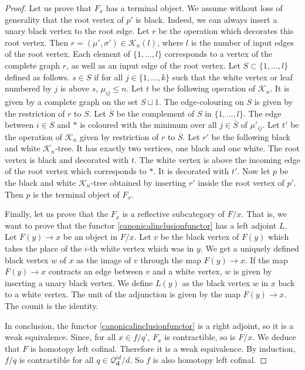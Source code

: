 \documentclass[]{amsart}
\theoremstyle{definition}
\begin{document}
\begin{proof}
	Let us prove that $F_x$ has a terminal object. We assume without loss of generality that the root vertex of $p'$ is black. Indeed, we can always insert a unary black vertex to the root edge. Let $r$ be the operation which decorates this root vertex. Then $r = (\mu',\sigma') \in \mathcal{K}_n(l)$, where $l$ is the number of input edges of the root vertex. Each element of $\{1,\ldots,l\}$ corresponds to a vertex of the complete graph $r$, as well as an input edge of the root vertex. Let $S \subset \{1,\ldots,l\}$ defined as follows. $s \in S$ if for all $j \in \{1,\ldots,k\}$ such that the white vertex or leaf numbered by $j$ is above $s$, $\mu_{ij} \leq n$. Let $t$ be the following operation of $\mathcal{K}_n$. It is given by a complete graph on the set $S \sqcup 1$. The edge-colouring on $S$ is given by the restriction of $r$ to $S$. Let $\overline{S}$ be the complement of $S$ in $\{1,\ldots,l\}$. The edge between $i \in S$ and $*$ is coloured with the minimum over all $j \in \overline{S}$ of $\mu'_{ij}$. Let $t'$ be the operation of $\mathcal{K}_n$ given by restriction of $r$ to $\overline{S}$. Let $r'$ be the following black and white $\mathcal{K}_n$-tree. It has exactly two vertices, one black and one white. The root vertex is black and decorated with $t$. The white vertex is above the incoming edge of the root vertex which corresponds to $*$. It is decorated with $t'$. Now let $p$ be the black and white $\mathcal{K}_n$-tree obtained by inserting $r'$ inside the root vertex of $p'$. Then $p$ is the terminal object of $F_x$.
	
	Finally, let us prove that the $F_x$ is a reflective subcategory of $F/x$. That is, we want to prove that the functor \eqref{canonicalinclusionfunctor} has a left adjoint $L$. Let $F(y) \to x$ be an object in $F/x$. Let $v$ be the black vertex of $F(y)$ which takes the place of the $i$-th white vertex which was in $y$. We get a uniquely defined black vertex $w$ of $x$ as the image of $v$ through the map $F(y) \to x$. If the map $F(y) \to x$ contracts an edge between $v$ and a white vertex, $w$ is given by inserting a unary black vertex. We define $L(y)$ as the black vertex $w$ in $x$ back to a white vertex. The unit of the adjunction is given by the map $F(y) \to x$. The counit is the identity.
	
	In conclusion, the functor \eqref{canonicalinclusionfunctor} is a right adjoint, so it is a weak equivalence. Since, for all $x \in f/q'$, $F_x$ is contractible, so is $F/x$. We deduce that $F$ is homotopy left cofinal. Therefore it is a weak equivalence. By induction, $f/q$ is contractible for all $q \in \mathcal{Q}_\mathbf{d}^{id}/d$. So $f$ is also homotopy left cofinal.
\end{proof}
\end{document}
